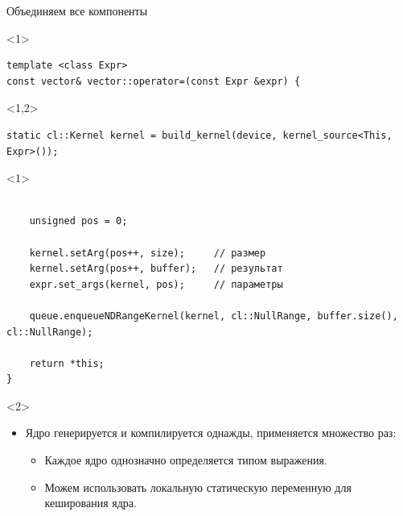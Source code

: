 \documentclass[@BEAMER_OPTIONS@]{beamer}
\begin{document}
\begin{frame}[fragile]{Объединяем все компоненты}
    \begin{exampleblock}{}
        \begin{uncoverenv}<1>
            \begin{lstlisting}
template <class Expr>
const vector& vector::operator=(const Expr &expr) {
            \end{lstlisting}
        \end{uncoverenv}
        \begin{uncoverenv}<1,2>
            \begin{lstlisting}[firstnumber=last]
    static cl::Kernel kernel = build_kernel(device, kernel_source<This, Expr>());
            \end{lstlisting}
        \end{uncoverenv}
        \begin{uncoverenv}<1>
            \begin{lstlisting}[firstnumber=last]

    unsigned pos = 0;

    kernel.setArg(pos++, size);     // размер
    kernel.setArg(pos++, buffer);   // результат
    expr.set_args(kernel, pos);     // параметры

    queue.enqueueNDRangeKernel(kernel, cl::NullRange, buffer.size(), cl::NullRange);

    return *this;
}
            \end{lstlisting}
        \end{uncoverenv}
    \end{exampleblock}
    \begin{uncoverenv}<2>
        \begin{itemize}
            \item Ядро генерируется и компилируется однажды, применяется
                множество раз:
                \begin{itemize}
                    \item Каждое ядро однозначно определяется типом выражения.
                    \item Можем использовать локальную статическую переменную
                        для кеширования ядра.
                \end{itemize}
        \end{itemize}
    \end{uncoverenv}
\end{frame}
\end{document}
